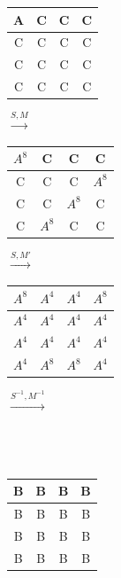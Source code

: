 \documentclass{transcrypto}
\begin{document}
\begin{tabular}{|c|c|c|c|}
    \hline
    A & C & C & C \\
    \hline 
    C & C & C & C \\
     \hline
    C & C & C & C \\
    \hline
    C & C & C & C \\
    \hline
\end{tabular}
$\xrightarrow{S,M}$
\begin{tabular}{|c|c|c|c|}
    \hline
     $A^8$ & C & C & C \\
    \hline 
    C & C & C &  $A^8$ \\
     \hline
    C & C &  $A^8$ & C \\
    \hline
    C &  $A^8$ & C & C \\
    \hline
\end{tabular}
$\xrightarrow{S,M'}$
\begin{tabular}{|c|c|c|c|}
    \hline
    $A^8$ &  $A^4$ &  $A^4$ &  $A^8$\\
    \hline 
    $A^4$ &  $A^4$ &  $A^4$ &  $A^4$  \\
     \hline
    $A^4$ &  $A^4$ &  $A^4$ &  $A^4$ \\
    \hline
    $A^4$ &  $A^8$ &  $A^8$ &  $A^4$\\
    \hline
\end{tabular}
$\xrightarrow{S^{-1},M^{-1}}$ \\ \\ \\ \\ 
\begin{tabular}{|c|c|c|c|}
    \hline
    B &  B &  B &  B\\
    \hline 
    B &  B &  B &  B  \\
     \hline
    B &  B &  B &  B \\
    \hline
   B &  B &  B &  B\\
    \hline
\end{tabular} \\ \\
\end{document}
